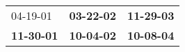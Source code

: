 \begin{supertabular}{p{0.33\columnwidth}p{0.33\columnwidth}p{0.33\columnwidth}}
          04-19-01\textsuperscript{} &  \textbf{03-22-02\textsuperscript{}} &  \textbf{11-29-03\textsuperscript{}} \\
 \textbf{11-30-01\textsuperscript{}} &  \textbf{10-04-02\textsuperscript{}} &  \textbf{10-08-04\textsuperscript{}} \\
\end{supertabular}
